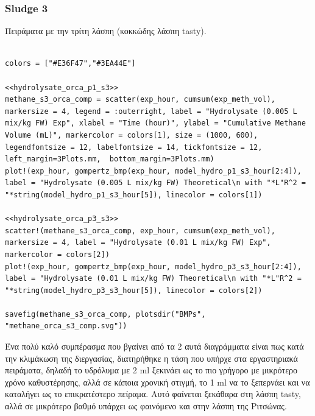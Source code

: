 \documentclass[11pt]{article}
\begin{document}
\begin{center}

\end{center}

\subsubsection{Sludge 3}
\label{sec:org2bc2c1e}
Πειράματα με την τρίτη λάσπη (κοκκώδης λάσπη tasty).

\begin{verbatim}

colors = ["#E36F47","#3EA44E"]

<<hydrolysate_orca_p1_s3>>
methane_s3_orca_comp = scatter(exp_hour, cumsum(exp_meth_vol), markersize = 4, legend = :outerright, label = "Hydrolysate (0.005 L mix/kg FW) Exp", xlabel = "Time (hour)", ylabel = "Cumulative Methane Volume (mL)", markercolor = colors[1], size = (1000, 600), legendfontsize = 12, labelfontsize = 14, tickfontsize = 12, left_margin=3Plots.mm,  bottom_margin=3Plots.mm)
plot!(exp_hour, gompertz_bmp(exp_hour, model_hydro_p1_s3_hour[2:4]), label = "Hydrolysate (0.005 L mix/kg FW) Theoretical\n with "*L"R^2 = "*string(model_hydro_p1_s3_hour[5]), linecolor = colors[1])

<<hydrolysate_orca_p3_s3>>
scatter!(methane_s3_orca_comp, exp_hour, cumsum(exp_meth_vol), markersize = 4, label = "Hydrolysate (0.01 L mix/kg FW) Exp", markercolor = colors[2])
plot!(exp_hour, gompertz_bmp(exp_hour, model_hydro_p3_s3_hour[2:4]), label = "Hydrolysate (0.01 L mix/kg FW) Theoretical\n with "*L"R^2 = "*string(model_hydro_p3_s3_hour[5]), linecolor = colors[2])

savefig(methane_s3_orca_comp, plotsdir("BMPs", "methane_orca_s3_comp.svg"))
\end{verbatim}

\begin{center}

\end{center}

Ένα πολύ καλό συμπέρασμα που βγαίνει από τα 2 αυτά διαγράμματα είναι πως κατά την κλιμάκωση της διεργασίας, διατηρήθηκε η τάση που υπήρχε στα εργαστηριακά πειράματα, δηλαδή το υδρόλυμα με 2 ml ξεκινάει ως το πιο γρήγορο με μικρότερο χρόνο καθυστέρησης, αλλά σε κάποια χρονική στιγμή, το 1 ml να το ξεπερνάει και να καταλήγει ως το επικρατέστερο πείραμα. Αυτό φαίνεται ξεκάθαρα στη λάσπη tasty, αλλά σε μικρότερο βαθμό υπάρχει ως φαινόμενο και στην λάσπη της Ριτσώνας.
\end{document}
